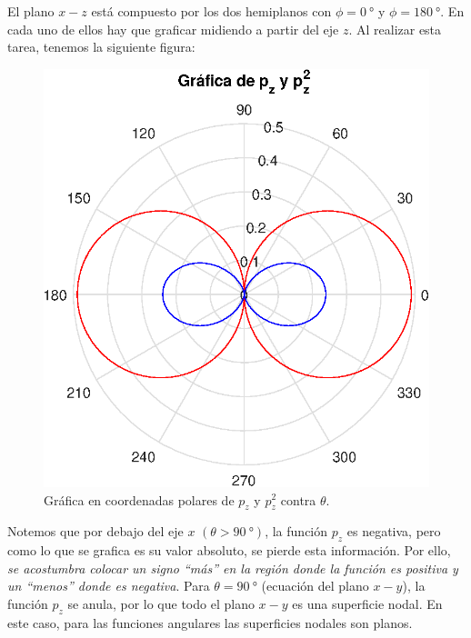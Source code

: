 \par
El plano $x-z$ está compuesto por los dos hemiplanos con $\phi = \SI{0}{\degree}$ y $\phi = \SI{180}{\degree}$. En cada uno de ellos hay que graficar midiendo a partir del eje $z$. Al realizar esta tarea, tenemos la siguiente figura:
\begin{figure}[H]
    \centering
    \includegraphics[scale=1]{Imagenes/Plot_AER_pz_theta_pz.eps}
    \caption{Gráfica en coordenadas polares de $p_{z}$ y $p_{z}^{2}$ contra $\theta$.}
    \label{fig:figura_plot_pz_pz2}
\end{figure}
Notemos que por debajo del eje $x$ $(\theta > \SI{90}{\degree})$, la función $p_{z}$ es negativa, pero como lo que se grafica es su valor absoluto, se pierde esta información. Por ello, \emph{se acostumbra colocar un signo \enquote{más} en la región donde la función es positiva y un \enquote{menos} donde es negativa}. Para $\theta = \SI{90}{\degree}$ (ecuación del plano $x-y$), la función $p_{z}$ se anula, por lo que todo el plano $x-y$ es una superficie nodal. En este caso, para las funciones angulares las superficies nodales son planos.
\par
